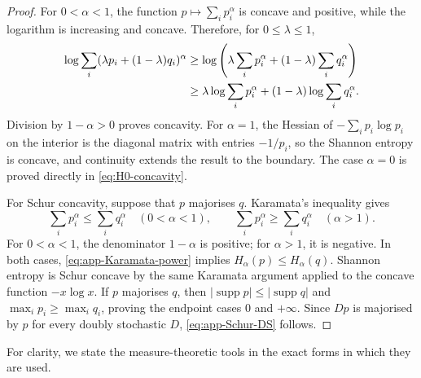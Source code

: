 \documentclass[aps,pra,11pt,onecolumn,nofootinbib,tightenlines]{revtex4-2}
\theoremstyle{definition}
\begin{document}
\begin{proof}
For $0<\alpha<1$, the function $p\mapsto\sum_i p_i^\alpha$ is concave and positive, while the logarithm is increasing and concave.  Therefore, for $0\leq\lambda\leq1$,
\begin{align}
 \log\sum_i(\lambda p_i+(1-\lambda)q_i)^\alpha
 &\geq\log\left(\lambda\sum_ip_i^\alpha+(1-\lambda)\sum_iq_i^\alpha\right)
 \notag\\
 &\geq\lambda\log\sum_ip_i^\alpha
 +(1-\lambda)\log\sum_iq_i^\alpha.
 \label{eq:app-renyi-concavity-chain}
\end{align}
Division by $1-\alpha>0$ proves concavity.  For $\alpha=1$, the Hessian of $-\sum_i p_i\log p_i$ on the interior is the diagonal matrix with entries $-1/p_i$, so the Shannon entropy is concave, and continuity extends the result to the boundary.  The case $\alpha=0$ is proved directly in \eqref{eq:H0-concavity}.

For Schur concavity, suppose that $p$ majorises $q$.  Karamata's inequality gives
\begin{equation}
 \sum_i p_i^\alpha\leq\sum_i q_i^\alpha
 \quad(0<\alpha<1),
 \qquad
 \sum_i p_i^\alpha\geq\sum_i q_i^\alpha
 \quad(\alpha>1).
 \label{eq:app-Karamata-power}
\end{equation}
For $0<\alpha<1$, the denominator $1-\alpha$ is positive; for $\alpha>1$, it is negative.  In both cases, \eqref{eq:app-Karamata-power} implies $H_\alpha(p)\leq H_\alpha(q)$.  Shannon entropy is Schur concave by the same Karamata argument applied to the concave function $-x\log x$.  If $p$ majorises $q$, then $|\operatorname{supp}p|\leq|\operatorname{supp}q|$ and $\max_i p_i\geq\max_iq_i$, proving the endpoint cases $0$ and $+\infty$.  Since $Dp$ is majorised by $p$ for every doubly stochastic $D$, \eqref{eq:app-Schur-DS} follows.
\end{proof}

For clarity, we state the measure-theoretic tools in the exact forms in which they are used.
\end{document}
